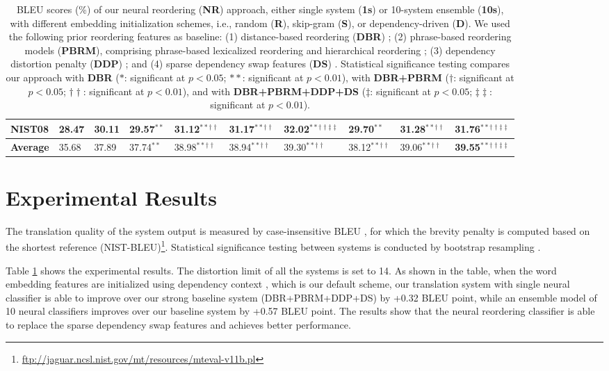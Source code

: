 \documentclass[letterpaper]{article}
\begin{document}
\begin{table}[ht]
\begin{adjustbox}{width=0.65\columnwidth}
\begin{tabular}{|l|l|l||l|l||l|l|l|l|l|}
{\bf NIST08} & 28.47 & 30.11 & 29.57$^{**}$ & 31.12$^{**\dagger\dagger}$ & 31.17$^{**\dagger\dagger}$ & 32.02$^{**\dagger\dagger\ddagger\ddagger}$ & 29.70$^{**}$ & 31.28$^{**\dagger\dagger}$ & 31.76$^{**\dagger\dagger\ddagger\ddagger}$\\\hline
\hline
{\bf Average} & 35.68 & 37.89 & 37.74$^{**}$ & 38.98$^{**\dagger\dagger}$ & 38.94$^{**\dagger\dagger}$ & 39.30$^{**\dagger\dagger}$ & 38.12$^{**\dagger\dagger}$ & 39.06$^{**\dagger\dagger}$ & {\bf 39.55}$^{**\dagger\dagger\ddagger\ddagger}$\\\hline
\end{tabular}
\end{adjustbox}
\caption{\label{tab:mainresult} BLEU scores (\%) of our neural reordering ({\bf NR}) approach, either single system ({\bf 1s}) or 10-system ensemble ({\bf 10s}), with different embedding initialization schemes, i.e., random ({\bf R}), skip-gram ({\bf S}), or dependency-driven ({\bf D}). We used the following prior reordering features as baseline: (1) distance-based reordering ({\bf DBR}) \cite{koehn_statistical_2003}; (2) phrase-based reordering models ({\bf PBRM}), comprising phrase-based lexicalized reordering \cite{tillmann_unigram_2004,koehn_edinburgh_2005} and hierarchical reordering \cite{galley_simple_2008}; (3) dependency distortion penalty ({\bf DDP}) \cite{cherry_cohesive_2008}; and (4) sparse dependency swap features ({\bf DS}) \cite{hadiwinoto_swap_2016}. Statistical significance testing compares our approach with {\bf DBR} ($*$: significant at $p < 0.05$; $**$: significant at $p < 0.01$), with {\bf DBR+PBRM} ($\dagger$: significant at $p < 0.05$; $\dagger\dagger$: significant at $p < 0.01$), and with {\bf DBR+PBRM+DDP+DS} ($\ddagger$: significant at $p < 0.05$; $\ddagger\ddagger$: significant at $p < 0.01$).}
\end{table}

\section{Experimental Results}

The translation quality of the system output is measured by case-insensitive BLEU \cite{papineni_bleu:_2002}, for which the brevity penalty is computed based on the shortest reference (NIST-BLEU)\footnote{\url{ftp://jaguar.ncsl.nist.gov/mt/resources/mteval-v11b.pl}}. Statistical significance testing between systems is conducted by bootstrap resampling \cite{koehn_statistical_2004}.

Table \ref{tab:mainresult} shows the experimental results. The distortion limit of all the systems is set to 14. As shown in the table, when the word embedding features are initialized using dependency context \cite{bansal_tailoring_2014}, which is our default scheme, our translation system with single neural classifier is able to improve over our strong baseline system (DBR+PBRM+DDP+DS) by +0.32 BLEU point, while an ensemble model of 10 neural classifiers improves over our baseline system by +0.57 BLEU point. The results show that the neural reordering classifier is able to replace the sparse dependency swap features and achieves better performance.
\end{document}
